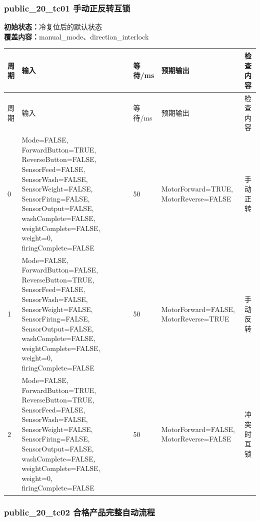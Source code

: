 \subsubsection{{\ttfamily public\_20\_tc01} 手动正反转互锁}

\noindent\textbf{初始状态：}冷复位后的默认状态\\

\textbf{覆盖内容：}manual\_mode、direction\_interlock

\begin{longtable}{L{1.0cm}L{4.7cm}L{1.4cm}L{4.0cm}L{2.1cm}}

\toprule

周期 & 输入 & 等待/ms & 预期输出 & 检查内容\\

\midrule

\endfirsthead

\toprule

周期 & 输入 & 等待/ms & 预期输出 & 检查内容\\

\midrule

\endhead

0 & Mode=FALSE, ForwardButton=TRUE, ReverseButton=FALSE, SensorFeed=FALSE, SensorWash=FALSE, SensorWeight=FALSE, SensorFiring=FALSE, SensorOutput=FALSE, washComplete=FALSE, weightComplete=FALSE, weight=0, firingComplete=FALSE & 50 & MotorForward=TRUE, MotorReverse=FALSE & 手动正转\\

1 & Mode=FALSE, ForwardButton=FALSE, ReverseButton=TRUE, SensorFeed=FALSE, SensorWash=FALSE, SensorWeight=FALSE, SensorFiring=FALSE, SensorOutput=FALSE, washComplete=FALSE, weightComplete=FALSE, weight=0, firingComplete=FALSE & 50 & MotorForward=FALSE, MotorReverse=TRUE & 手动反转\\

2 & Mode=FALSE, ForwardButton=TRUE, ReverseButton=TRUE, SensorFeed=FALSE, SensorWash=FALSE, SensorWeight=FALSE, SensorFiring=FALSE, SensorOutput=FALSE, washComplete=FALSE, weightComplete=FALSE, weight=0, firingComplete=FALSE & 50 & MotorForward=FALSE, MotorReverse=FALSE & 冲突时互锁\\

\bottomrule

\end{longtable}

\subsubsection{{\ttfamily public\_20\_tc02} 合格产品完整自动流程}

